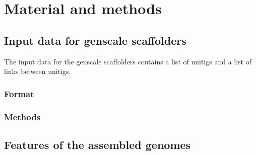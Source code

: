 \documentclass[10pt, twocolumn]{article}
\begin{document}

\section{Material and methods}
\subsection{Input data for genscale scaffolders}
The input data for the genscale scaffolders contains a list of unitigs and a list of links between unitigs. 
\subsubsection{Format}
\subsubsection{Methods}
\subsection{Features of the assembled genomes}
\end{document}
